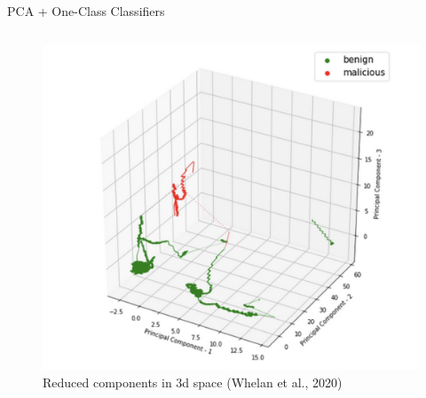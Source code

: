 \documentclass[aspectratio=169, 8pt]{beamer}
\begin{document}
\begin{frame}{PCA + One-Class Classifiers}
\begin{columns}[T]
{\begin{column}{0.5\linewidth}
        \begin{figure}
            \centering
            \includegraphics[width = 0.5 \textwidth]{images/whelan-pca.png}
            \caption{Reduced components in 3d space (Whelan et al., 2020)}
            \label{fig:pca-2}
        \end{figure}
    \end{column}
    }
\end{columns}

\end{frame}

\end{document}
